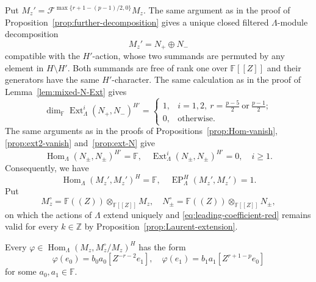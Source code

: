 \documentclass[11pt,a4paper]{article} %
\def\FF{\mathbb{F}}
\def\cF{\mathcal{F}}
\def\dim{\operatorname{dim}}
\def\EP{\operatorname{EP}}
\def\Ext{\operatorname{Ext}} %
\def\Hom{\operatorname{Hom}}
\def\max{\operatorname{max}}
\begin{document}
Put $M_z'=\cF^{\max\{r+1-(p-1)/2,0\}}M_z$. The same argument as in the proof of Proposition~\ref{prop:further-decomposition}
gives a unique closed filtered $\Lambda$-module decomposition
\[
M_z'=N_+\oplus N_-
\]
compatible with the $H'$-action, whose two summands are permuted by any element in $H\setminus H'$. Both summands are free of rank one over $\FF[[Z]]$ and their generators have the same $H'$-character. 
The same calculation as in the proof of Lemma~\ref{lem:mixed-N-Ext} gives
\[
\dim_\FF\Ext^i_\Lambda(N_+,N_-)^{H'}
=\begin{cases}
1,&i=1,2,~r=\frac{p-5}{2}~\text{or}~\frac{p-1}{2};\\
0,&\text{otherwise}.
\end{cases}
\]
The same arguments as in the proofs of Propositions~\ref{prop:Hom-vanish},
\ref{prop:ext2-vanish} and~\ref{prop:ext-N} give
\[
\Hom_\Lambda(N_\pm,N_\pm)^{H'}=\FF,
\quad
\Ext^i_\Lambda(N_\pm,N_\pm)^{H'}=0,\quad i\ge1.
\]
Consequently, we have
\[
\Hom_\Lambda(M_z',M_z')^H=\FF,
\quad \EP_\Lambda^H(M_z',M_z')=1.
\]
Put
\[
M_z^\circ=\FF((Z))\otimes_{\FF[[Z]]}M_z,\quad N_\pm^\circ=\FF((Z))\otimes_{\FF[[Z]]}N_\pm,
\]
on which the actions of $\Lambda$ extend uniquely and \eqref{eq:leading-coefficient-red} remains valid for every $k\in\mathbb Z$ by Proposition~\ref{prop:Laurent-extension}.

\begin{lemma}\label{lem:reducible-principal-parts}
Every $\varphi\in\Hom_\Lambda(M_z,M_z^\circ/M_z)^H$ has the form
\[
\varphi(e_0)=b_0a_0[Z^{-r-2}e_1],\quad
\varphi(e_1)=b_1a_1[Z^{r+1-p}e_0]
\]
for some $a_0,a_1\in\FF$.
\end{lemma}
\end{document}
